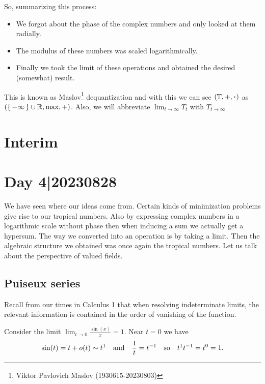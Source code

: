 \documentclass[12pt]{memoir}
\begin{document}
So, summarizing this process:
\begin{itemize}
    \item We forgot about the phase of the complex numbers and only looked at them radially. 
    \item The modulus of these numbers was scaled logarithmically.
    \item Finally we took the limit of these operations and obtained the desired (somewhat) result.
\end{itemize}
This is known as Maslov\footnote{Viktor Pavlovich Maslov (1930615-20230803)} dequantization and with this we can see $(\bT,+,\.)$ as $(\{\,-\infty\,\}\cup\mathbb{R},\max,+)$. Also, we will abbreviate $\lim_{t\to\infty}T_t$ with $T_{t\to\infty}$

\section{Interim}

\section{Day 4|20230828}

We have seen where our ideas come from. Certain kinds of minimization problems give rise to our tropical numbers. Also by expressing complex numbers in a logarithmic scale without phase then when inducing a sum we actually get a hypersum. The way we converted into an operation is by taking a limit. Then the algebraic structure we obtained was once again the tropical numbers. Let us talk about the perspective of valued fields.
\subsection{Puiseux series}
Recall from our times in Calculus 1 that when resolving indeterminate limits, the relevant information is contained in the order of vanishing of the function.

\begin{Ex}
    Consider the limit $\lim_{t\to 0}\frac{\sin(x)}{x}=1$. Near $t=0$ we have 
    $$\sin(t)=t+o(t)\sim t^1\quad\text{and}\quad\frac{1}{t}=t^{-1}\quad\text{so}\quad t^1t^{-1}=t^0=1.$$
\end{Ex}
\end{document}
